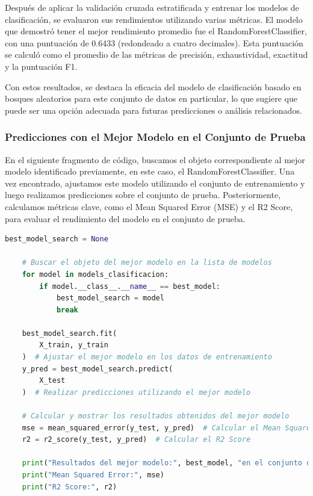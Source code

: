 Después de aplicar la validación cruzada estratificada y entrenar los modelos de clasificación, se evaluaron sus rendimientos utilizando varias métricas. El modelo que demostró tener el mejor rendimiento promedio fue el RandomForestClassifier, con una puntuación de 0.6433 (redondeado a cuatro decimales). Esta puntuación se calculó como el promedio de las métricas de precisión, exhaustividad, exactitud y la puntuación F1.

Con estos resultados, se destaca la eficacia del modelo de clasificación basado en bosques aleatorios para este conjunto de datos en particular, lo que sugiere que puede ser una opción adecuada para futuras predicciones o análisis relacionados.


\subsubsection{Predicciones con el Mejor Modelo en el Conjunto de Prueba}

En el siguiente fragmento de código, buscamos el objeto correspondiente al mejor modelo identificado previamente, en este caso, el RandomForestClassifier. Una vez encontrado, ajustamos este modelo utilizando el conjunto de entrenamiento y luego realizamos predicciones sobre el conjunto de prueba. Posteriormente, calculamos métricas clave, como el Mean Squared Error (MSE) y el R2 Score, para evaluar el rendimiento del modelo en el conjunto de prueba.

\begin{lstlisting}[language=Python, caption=Predicciones y evaluación del mejor modelo, label=lst:prediccion_mejor_modelo]
    best_model_search = None

    # Buscar el objeto del mejor modelo en la lista de modelos
    for model in models_clasificacion:
        if model.__class__.__name__ == best_model:
            best_model_search = model
            break
    
    best_model_search.fit(
        X_train, y_train
    )  # Ajustar el mejor modelo en los datos de entrenamiento
    y_pred = best_model_search.predict(
        X_test
    )  # Realizar predicciones utilizando el mejor modelo
    
    # Calcular y mostrar los resultados obtenidos del mejor modelo
    mse = mean_squared_error(y_test, y_pred)  # Calcular el Mean Squared Error
    r2 = r2_score(y_test, y_pred)  # Calcular el R2 Score
    
    print("Resultados del mejor modelo:", best_model, "en el conjunto de prueba:")
    print("Mean Squared Error:", mse)
    print("R2 Score:", r2)
    \end{lstlisting}

